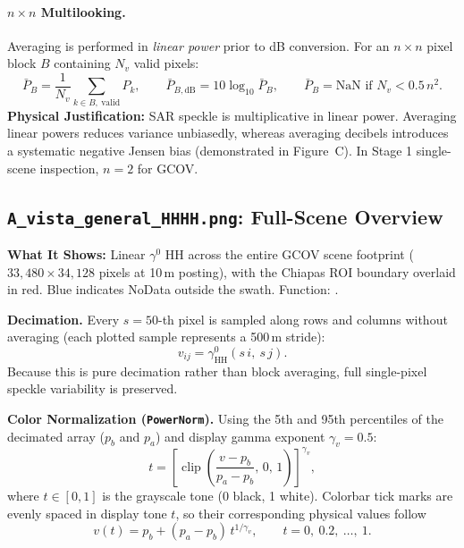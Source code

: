 \documentclass[11pt,a4paper]{article}
\newcommand{\gz}{\ensuremath{\gamma^{0}}}
\begin{document}
\paragraph{$n\times n$ Multilooking.} Averaging is performed in \emph{linear power} prior to dB conversion. For an $n\times n$ pixel block $B$ containing $N_v$ valid pixels:
\begin{equation}
  \bar{P}_B = \frac{1}{N_v}\sum_{k \in B,\ \text{valid}} P_k,
  \qquad
  \bar{P}_{B,\text{dB}} = 10\log_{10}\bar{P}_B,
  \qquad
  \bar{P}_B = \mathrm{NaN}\text{ if } N_v < 0.5\,n^2 .
  \label{eq:multilook}
\end{equation}
\textbf{Physical Justification:} SAR speckle is multiplicative in linear power. Averaging linear powers reduces variance unbiasedly, whereas averaging decibels introduces a systematic negative Jensen bias (demonstrated in Figure~C). In Stage 1 single-scene inspection, $n = 2$ for GCOV.

\subsection{\texttt{A\_vista\_general\_HHHH.png}: Full-Scene Overview}

\textbf{What It Shows:} Linear \gz{} HH across the entire GCOV scene footprint ($33,480\times 34,128$ pixels at 10\,m posting), with the Chiapas ROI boundary overlaid in red. Blue indicates NoData outside the swath. Function: .

\textbf{Decimation.} Every $s = 50$-th pixel is sampled along rows and columns without averaging (each plotted sample represents a 500\,m stride):
\begin{equation}
  v_{ij} = \gamma^0_{\text{HH}}(s\,i,\ s\,j).
\end{equation}
Because this is pure decimation rather than block averaging, full single-pixel speckle variability is preserved.

\textbf{Color Normalization (\texttt{PowerNorm}).} Using the 5th and 95th percentiles of the decimated array ($p_b$ and $p_a$) and display gamma exponent $\gamma_v = 0.5$:
\begin{equation}
  t = \left[\operatorname{clip}\!\left(\frac{v - p_b}{p_a - p_b},\, 0,\, 1\right)\right]^{\gamma_v},
\end{equation}
where $t\in[0,1]$ is the grayscale tone (0 black, 1 white). Colorbar tick marks are evenly spaced in display tone $t$, so their corresponding physical values follow
\begin{equation}
  v(t) = p_b + (p_a - p_b)\, t^{1/\gamma_v}, \qquad t = 0,\ 0.2,\ \ldots,\ 1 .
\end{equation}
\end{document}
